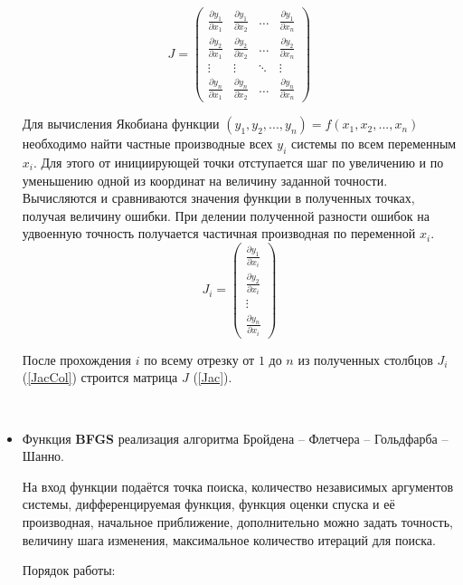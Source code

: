\begin{itemize}
\begin{equation}
J = \left(
\begin{array}{cccc}\label{Jac}
\frac{\partial y_1}{\partial x_1} & \frac{\partial y_1}{\partial x_2} & \ldots & \frac{\partial y_1}{\partial x_n}\\
\frac{\partial y_2}{\partial x_1} & \frac{\partial y_2}{\partial x_2} & \ldots & \frac{\partial y_2}{\partial x_n}\\
\vdots & \vdots & \ddots & \vdots\\
\frac{\partial y_n}{\partial x_1} & \frac{\partial y_n}{\partial x_2} & \ldots & \frac{\partial y_n}{\partial x_n}
\end{array}
\right)
\end{equation}

Для вычисления Якобиана функции $(y_1, y_2,...,y_n) =  f(x_1, x_2,...,x_n)$ необходимо найти частные производные всех $y_i$ системы по всем переменным $x_i$. Для этого от инициирующей точки отступается шаг по увеличению и по уменьшению одной из координат на величину заданной точности. Вычисляются и сравниваются значения функции в полученных точках, получая величину ошибки. При делении полученной разности ошибок на удвоенную точность получается частичная производная по переменной $x_i$.
\begin{equation}\label{JacCol}
J_i = \left(
\begin{array}{c}
\frac{\partial y_1}{\partial x_i}\\
\frac{\partial y_2}{\partial x_i}\\
\vdots\\
\frac{\partial y_n}{\partial x_i}
\end{array}
\right)
\end{equation}

После прохождения $i$ по всему отрезку от $1$ до $n$ из полученных столбцов $J_i$ (\ref{JacCol}) строится матрица $J$ (\ref{Jac}).

~

\newpage
\item 
Функция \textbf{BFGS} реализация алгоритма Бройдена -- Флетчера -- Гольдфарба -- Шанно.

На вход функции подаётся точка поиска, количество независимых аргументов системы, дифференцируемая функция, функция оценки спуска и её производная, начальное приближение, дополнительно можно задать точность, величину шага изменения, максимальное количество итераций для поиска. 

Порядок работы:


\end{itemize}
